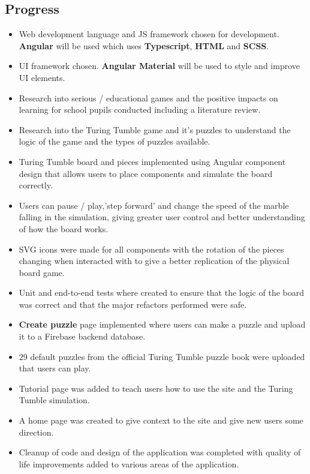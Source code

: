 \documentclass[11pt]{article}
\begin{document}
\subsection{Progress}\label{progress}

\begin{itemize}
    \item Web development language and JS framework chosen for development. \textbf{Angular} will be used which uses \textbf{Typescript}, \textbf{HTML} and \textbf{SCSS}.
    \item UI framework chosen. \textbf{Angular Material} will be used to style and improve UI elements.
    \item Research into serious / educational games and the positive impacts on learning for school pupils conducted including a literature review.
    \item Research into the Turing Tumble game and it's puzzles to understand the logic of the game and the types of puzzles available.
    \item Turing Tumble board and pieces implemented using Angular component design that allows users to place components and simulate the board correctly.
    \item Users can pause / play,'step forward' and change the speed of the marble falling in the simulation, giving greater user control and better understanding of how the board works.
    \item SVG icons were made for all components with the rotation of the pieces changing when interacted with to give a better replication of the physical board game.
    \item Unit and end-to-end tests where created to ensure that the logic of the board was correct and that the major refactors performed were safe.
    \item \textbf{Create puzzle} page implemented where users can make a puzzle and upload it to a Firebase backend database.
    \item 29 default puzzles from the official Turing Tumble puzzle book were uploaded that users can play.
    \item Tutorial page was added to teach users how to use the site and the Turing Tumble simulation.
    \item A home page was created to give context to the site and give new users some direction.
    \item Cleanup of code and design of the application was completed with quality of life improvements added to various areas of the application.
\end{itemize}
\end{document}
